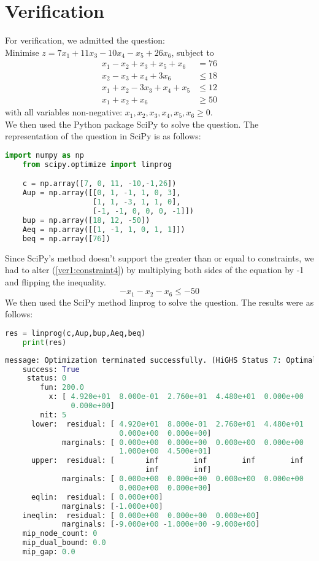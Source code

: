 \documentclass{article}
\numberwithin{equation}{section}
\begin{document}
\section{Verification}
For verification, we admitted the question: \\
Minimise $z = 7x_1 + 11x_3 - 10x_4 - x_5 + 26x_6$, subject to
\begin{align}
    x_1 - x_2 + x_3 + x_5 + x_6 &= 76 \label{ver1:constraint1} \\
    x_2 - x_3 + x_4 + 3x_6 &\leq 18 \label{ver1:constraint2} \\
    x_1 + x_2 - 3x_3 + x_4 + x_5 &\leq 12 \label{ver1:constraint3} \\
    x_1 + x_2 + x_6 &\geq 50 \label{ver1:constraint4}
\end{align}
with all variables non-negative: $x_1, x_2, x_3, x_4, x_5, x_6 \geq 0$. \\
We then used the Python package SciPy to solve the question. The representation of the question in SciPy is as follows:
\begin{lstlisting}[language=Python, basicstyle=\scriptsize, frame=single]
    import numpy as np
    from scipy.optimize import linprog

    c = np.array([7, 0, 11, -10,-1,26])
    Aup = np.array([[0, 1, -1, 1, 0, 3],
                    [1, 1, -3, 1, 1, 0],
                    [-1, -1, 0, 0, 0, -1]])
    bup = np.array([18, 12, -50])
    Aeq = np.array([[1, -1, 1, 0, 1, 1]])
    beq = np.array([76])
\end{lstlisting}
Since SciPy's method doesn't support the greater than or equal to constraints, we had to alter (\ref{ver1:constraint4}) by multiplying both sides of the equation by -1 and flipping the inequality. 
\begin{equation}
    -x_1 - x_2 - x_6 \leq -50
\end{equation}
We then used the SciPy method linprog to solve the question. The results were as follows:
\begin{lstlisting}[language=Python, basicstyle=\scriptsize, frame=single]
    res = linprog(c,Aup,bup,Aeq,beq)
    print(res)
\end{lstlisting}
\begin{lstlisting}[language=Python, basicstyle=\scriptsize]
    message: Optimization terminated successfully. (HiGHS Status 7: Optimal)
    success: True
     status: 0
        fun: 200.0
          x: [ 4.920e+01  8.000e-01  2.760e+01  4.480e+01  0.000e+00
               0.000e+00]
        nit: 5
      lower:  residual: [ 4.920e+01  8.000e-01  2.760e+01  4.480e+01
                          0.000e+00  0.000e+00]
             marginals: [ 0.000e+00  0.000e+00  0.000e+00  0.000e+00
                          1.000e+00  4.500e+01]
      upper:  residual: [       inf        inf        inf        inf
                                inf        inf]
             marginals: [ 0.000e+00  0.000e+00  0.000e+00  0.000e+00
                          0.000e+00  0.000e+00]
      eqlin:  residual: [ 0.000e+00]
             marginals: [-1.000e+00]
    ineqlin:  residual: [ 0.000e+00  0.000e+00  0.000e+00]
             marginals: [-9.000e+00 -1.000e+00 -9.000e+00]
    mip_node_count: 0
    mip_dual_bound: 0.0
    mip_gap: 0.0
\end{lstlisting}
\end{document}
